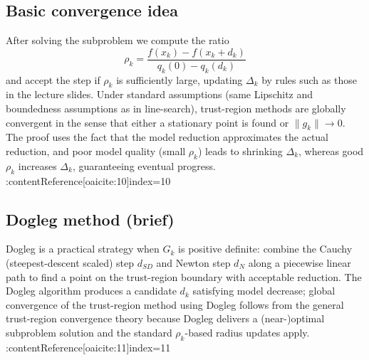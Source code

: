 \documentclass{MathNote}
\begin{document}
\subsection{Basic convergence idea}
After solving the subproblem we compute the ratio
\[
\rho_k=\frac{f(x_k)-f(x_k+d_k)}{q_k(0)-q_k(d_k)}
\]
and accept the step if \(\rho_k\) is sufficiently large, updating \(\Delta_k\) by rules such as those in the lecture slides. Under standard assumptions (same Lipschitz and boundedness assumptions as in line-search), trust-region methods are globally convergent in the sense that either a stationary point is found or \(\|g_k\|\to0\). The proof uses the fact that the model reduction approximates the actual reduction, and poor model quality (small \(\rho_k\)) leads to shrinking \(\Delta_k\), whereas good \(\rho_k\) increases \(\Delta_k\), guaranteeing eventual progress. :contentReference[oaicite:10]{index=10}

\subsection{Dogleg method (brief)}
Dogleg is a practical strategy when \(G_k\) is positive definite: combine the Cauchy (steepest-descent scaled) step \(d_{SD}\) and Newton step \(d_N\) along a piecewise linear path to find a point on the trust-region boundary with acceptable reduction. The Dogleg algorithm produces a candidate \(d_k\) satisfying model decrease; global convergence of the trust-region method using Dogleg follows from the general trust-region convergence theory because Dogleg delivers a (near-)optimal subproblem solution and the standard \(\rho_k\)-based radius updates apply. :contentReference[oaicite:11]{index=11}
\end{document}
